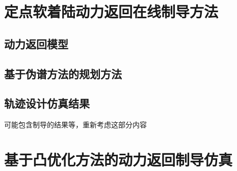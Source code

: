 \chapter{定点软着陆动力返回在线制导方法}
\section{动力返回模型}
\section{基于伪谱方法的规划方法}
\section{轨迹设计仿真结果}
可能包含制导的结果等，重新考虑这部分内容

\chapter{基于凸优化方法的动力返回制导仿真}